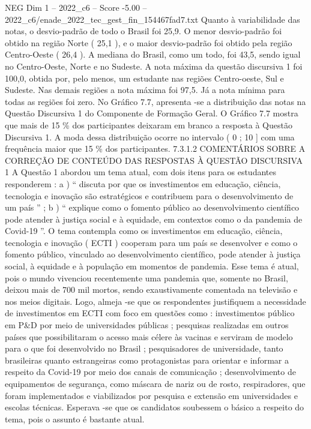 \begin{textsample}{NEG Dim 1 – 2022\_c6 – Score -5.00 – 2022\_c6/enade\_2022\_tec\_gest\_fin\_154467fad7.txt}
Quanto à variabilidade das notas, o desvio-padrão de todo o Brasil foi 25,9.
O menor desvio-padrão foi obtido na região Norte ( 25,1 ), e o maior desvio-padrão foi obtido pela região Centro-Oeste ( 26,4 ).
A mediana do Brasil, como um todo, foi 43,5, sendo igual no Centro-Oeste, Norte e no Sudeste.
A nota máxima da questão discursiva 1 foi 100,0, obtida por, pelo menos, um estudante nas regiões Centro-oeste, Sul e Sudeste.
Nas demais regiões a nota máxima foi 97,5.
Já a nota mínima para todas as regiões foi zero.
No Gráfico 7.7, apresenta -se a distribuição das notas na Questão Discursiva 1 do Componente de Formação Geral.
O Gráfico 7.7 mostra que mais de 15 \% dos participantes deixaram em branco a resposta à Questão Discursiva 1.
A moda dessa distribuição ocorre no intervalo ( 0 ; 10 ] com uma frequência maior que 15 \% dos participantes. 7.3.1.2 COMENTÁRIOS SOBRE A CORREÇÃO DE CONTEÚDO DAS RESPOSTAS À QUESTÃO DISCURSIVA 1 A Questão 1 abordou um tema atual, com dois itens para os estudantes responderem : a ) “ discuta por que os investimentos em educação, ciência, tecnologia e inovação são estratégicos e contribuem para o desenvolvimento de um país ” ; b ) “ explique como o fomento público ao desenvolvimento científico pode atender à justiça social e à equidade, em contextos como o da pandemia de Covid-19 ”.
O tema contempla como os investimentos em educação, ciência, tecnologia e inovação ( ECTI ) cooperam para um país se desenvolver e como o fomento público, vinculado ao desenvolvimento científico, pode atender à justiça social, à equidade e à população em momentos de pandemia.
Esse tema é atual, pois o mundo vivenciou recentemente uma pandemia que, somente no Brasil, deixou mais de 700 mil mortos, sendo exaustivamente comentada na televisão e nos meios digitais.
Logo, almeja -se que os respondentes justifiquem a necessidade de investimentos em ECTI com foco em questões como : investimentos público em P\&D por meio de universidades públicas ; pesquisas realizadas em outros países que possibilitaram o acesso mais célere às vacinas e serviram de modelo para o que foi desenvolvido no Brasil ; pesquisadores de universidade, tanto brasileiras quanto estrangeiras como protagonistas para orientar e informar a respeito da Covid-19 por meio dos canais de comunicação ; desenvolvimento de equipamentos de segurança, como máscara de nariz ou de rosto, respiradores, que foram implementados e viabilizados por pesquisa e extensão em universidades e escolas técnicas.
Esperava -se que os candidatos soubessem o básico a respeito do tema, pois o assunto é bastante atual.

\end{textsample}
